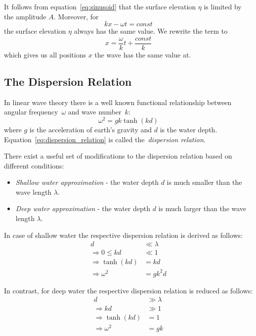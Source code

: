 It follows from equation~\ref{eq:sinusoid} that the surface elevation $\eta$ is limited by the amplitude $A$.
Moreover, for
\begin{equation}
kx - \omega t = const
\end{equation}
the surface elevation $\eta$ always has the same value. We rewrite the term to
\begin{equation}
x = \frac{\omega}{k}t + \frac{const}{k}
\end{equation}
which gives us all positions $x$ the wave has the same value at.
%

\subsection{The Dispersion Relation}
\label{sec:dispersion_relation}

In linear wave theory there is a well known functional relationship between angular frequency~$\omega$
and wave number~$k$:
%
\begin{equation}
\label{eq:dispersion_relation}
 \omega^2 = gk\tanh(kd)
\end{equation}
%
where $g$ is the acceleration of earth's gravity and $d$ is the water depth. Equation~\ref{eq:dispersion_relation}
is called the~\emph{dispersion relation}.

There exist a useful set of modifications to the dispersion relation based on different conditions:
\begin{itemize}
 \item \emph{Shallow water approximation} - the water depth $d$ is much smaller than the wave length $\lambda$.
 \item \emph{Deep water approximation} - the water depth $d$ is much larger than the wave length $\lambda$.
\end{itemize}

In case of shallow water the respective dispersion relation is derived as follows:
\begin{align}
 d & \ll \lambda \\
 \Rightarrow 0 \leq kd & \ll 1 \\
 \Rightarrow \tanh(kd) & = kd \\
 \Rightarrow \omega^2 & = gk^2d
\end{align}

In contrast, for deep water the respective dispersion relation is reduced as follows:
\begin{align}
 d & \gg \lambda \\
 \Rightarrow kd & \gg 1 \\
 \Rightarrow \tanh(kd) & = 1 \\
 \Rightarrow \omega^2 & = gk
\end{align}


